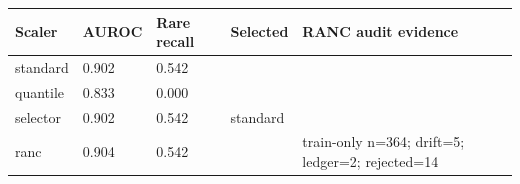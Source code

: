 \begin{tabular}{lllll}
\toprule
Scaler & AUROC & Rare recall & Selected & RANC audit evidence \\
\midrule
standard & 0.902 & 0.542 &  &  \\
quantile & 0.833 & 0.000 &  &  \\
selector & 0.902 & 0.542 & standard &  \\
ranc & 0.904 & 0.542 &  & train-only n=364; drift=5; ledger=2; rejected=14 \\
\bottomrule
\end{tabular}
